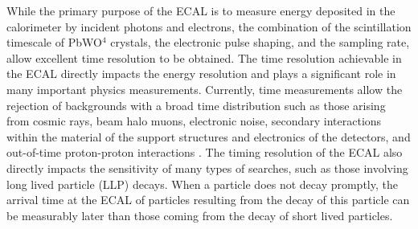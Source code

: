 
While the primary purpose of the ECAL is to measure energy deposited in the calorimeter by incident photons and electrons, the combination of the scintillation timescale of PbWO$^{4}$ crystals, the electronic pulse shaping, and the sampling rate, allow excellent time resolution to be obtained. The time resolution achievable in the ECAL directly impacts the energy resolution and plays a significant role in many important physics measurements. Currently, time measurements allow the rejection of backgrounds with a broad time distribution such as those arising from cosmic rays, beam halo muons, electronic noise, secondary interactions within the material of the support structures and electronics of the detectors, and out-of-time proton-proton interactions \cite{Bruneliere:2006ra}. The timing resolution of the ECAL also directly impacts the sensitivity of many types of searches, such as those involving long lived particle (LLP) decays. When a particle does not decay promptly, the arrival time at the ECAL of particles resulting from the decay of this particle can be measurably later than those coming from the decay of short lived particles. 


